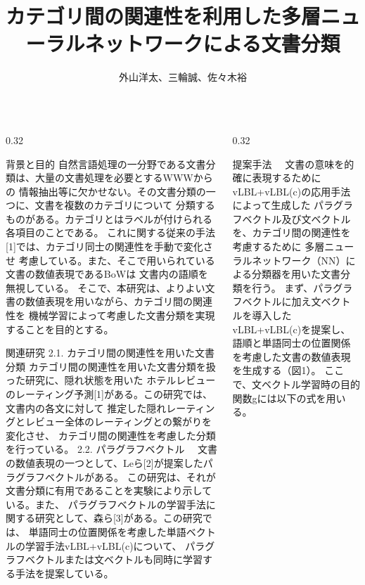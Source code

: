 \documentclass[10pt,unicode]{beamer}
\title{カテゴリ間の関連性を利用した多層ニューラルネットワークによる文書分類}
\author{外山洋太、三輪誠、佐々木裕}
\institute{豊田工業大学 工学部 先端工学基礎学科}
\date{}
\newcommand{\columnsize}{0.32}
\begin{document}
\begin{frame}{}
\maketitle
\vspace{-5ex} %
\begin{columns}[t]

\begin{column}{\columnsize\textwidth} %
  \begin{block}{背景と目的}
  自然言語処理の一分野である文書分類は、大量の文書処理を必要とするWWWからの
  情報抽出等に欠かせない。その文書分類の一つに、文書を複数のカテゴリについて
  分類するものがある。カテゴリとはラベルが付けられる各項目のことである。
  これに関する従来の手法[1]では、カテゴリ同士の関連性を手動で変化させ
  考慮している。また、そこで用いられている文書の数値表現であるBoWは
  文書内の語順を無視している。
  そこで、本研究は、よりよい文書の数値表現を用いながら、カテゴリ間の関連性を
  機械学習によって考慮した文書分類を実現することを目的とする。
  \end{block}

  \begin{block}{関連研究}
    2.1. カテゴリ間の関連性を用いた文書分類
    カテゴリ間の関連性を用いた文書分類を扱った研究に、隠れ状態を用いた
    ホテルレビューのレーティング予測[1]がある。この研究では、文書内の各文に対して
    推定した隠れレーティングとレビュー全体のレーティングとの繋がりを変化させ、
    カテゴリ間の関連性を考慮した分類を行っている。
    2.2. パラグラフベクトル
    　文書の数値表現の一つとして、Leら[2]が提案したパラグラフベクトルがある。
    この研究は、それが文書分類に有用であることを実験により示している。また、
    パラグラフベクトルの学習手法に関する研究として、森ら[3]がある。この研究では、
    単語同士の位置関係を考慮した単語ベクトルの学習手法vLBL+vLBL(c)について、
    パラグラフベクトルまたは文ベクトルも同時に学習する手法を提案している。
  \end{block}
\end{column} %

\begin{column}{\columnsize\textwidth} %
  \begin{block}{提案手法}
    　文書の意味を的確に表現するためにvLBL+vLBL(c)の応用手法によって生成した
    パラグラフベクトル及び文ベクトルを、カテゴリ間の関連性を考慮するために
    多層ニューラルネットワーク（NN）による分類器を用いた文書分類を行う。
    まず、パラグラフベクトルに加え文ベクトルを導入したvLBL+vLBL(c)を提案し、
    語順と単語同士の位置関係を考慮した文書の数値表現を生成する（図1）。
    ここで、文ベクトル学習時の目的関数gには以下の式を用いる。


\end{block}
\end{column}
\end{columns}
\end{frame}
\end{document}
